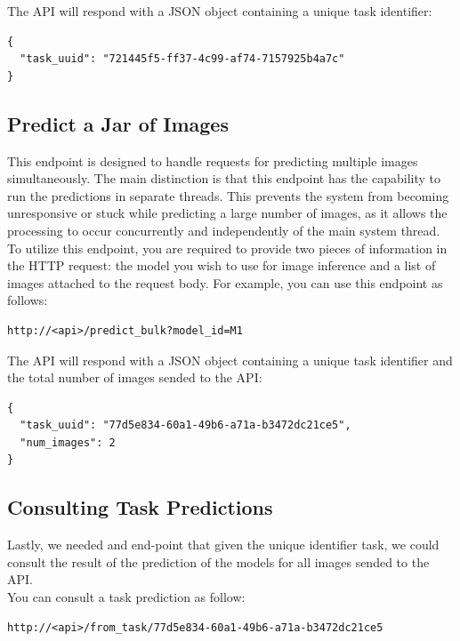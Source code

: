 The API will respond with a JSON object containing a unique task identifier:

\begin{Verbatim}[fontsize=\scriptsize]
{
  "task_uuid": "721445f5-ff37-4c99-af74-7157925b4a7c"
}
\end{Verbatim}


\subsection{Predict a Jar of Images}

This endpoint is designed to handle requests for predicting multiple images simultaneously.
The main distinction is that this endpoint has the capability to run the predictions in separate threads.
This prevents the system from becoming unresponsive or stuck while predicting a large number of images,
as it allows the processing to occur concurrently and independently of the main system thread. \\

To utilize this endpoint, you are required to provide two pieces of information in the HTTP request:
the model you wish to use for image inference and a list of images attached to the request body.
For example, you can use this endpoint as follows:

\begin{Verbatim}[fontsize=\scriptsize]
http://<api>/predict_bulk?model_id=M1
\end{Verbatim}

The API will respond with a JSON object containing a unique task identifier
and the total number of images sended to the API:

\begin{Verbatim}[fontsize=\scriptsize]
{
  "task_uuid": "77d5e834-60a1-49b6-a71a-b3472dc21ce5",
  "num_images": 2
}
\end{Verbatim}


\subsection{Consulting Task Predictions}

Lastly, we needed and end-point that given the unique identifier task,
we could consult the result of the prediction of the models for all images
sended to the API. \\

You can consult a task prediction as follow:

\begin{Verbatim}[fontsize=\scriptsize]
http://<api>/from_task/77d5e834-60a1-49b6-a71a-b3472dc21ce5
\end{Verbatim}

